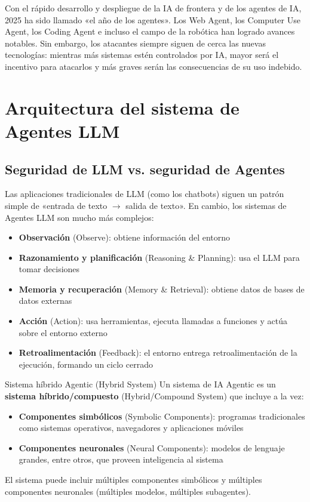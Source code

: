 \documentclass[a4paper]{article}
\begin{document}
Con el rápido desarrollo y despliegue de la IA de frontera y de los agentes de IA, 2025 ha sido llamado «el año de los agentes». Los Web Agent, los Computer Use Agent, los Coding Agent e incluso el campo de la robótica han logrado avances notables. Sin embargo, los atacantes siempre siguen de cerca las nuevas tecnologías: mientras más sistemas estén controlados por IA, mayor será el incentivo para atacarlos y más graves serán las consecuencias de su uso indebido.
\section{Arquitectura del sistema de Agentes LLM}

\subsection{Seguridad de LLM vs. seguridad de Agentes}

Las aplicaciones tradicionales de LLM (como los chatbots) siguen un patrón simple de «entrada de texto $\to$ salida de texto». En cambio, los sistemas de Agentes LLM son mucho más complejos:

\begin{itemize}
    \item \textbf{Observación} (Observe): obtiene información del entorno
    \item \textbf{Razonamiento y planificación} (Reasoning \& Planning): usa el LLM para tomar decisiones
    \item \textbf{Memoria y recuperación} (Memory \& Retrieval): obtiene datos de bases de datos externas
    \item \textbf{Acción} (Action): usa herramientas, ejecuta llamadas a funciones y actúa sobre el entorno externo
    \item \textbf{Retroalimentación} (Feedback): el entorno entrega retroalimentación de la ejecución, formando un ciclo cerrado
\end{itemize}

\begin{importantbox}{Sistema híbrido Agentic (Hybrid System)}
Un sistema de IA Agentic es un \textbf{sistema híbrido/compuesto} (Hybrid/Compound System) que incluye a la vez:
\begin{itemize}
    \item \textbf{Componentes simbólicos} (Symbolic Components): programas tradicionales como sistemas operativos, navegadores y aplicaciones móviles
    \item \textbf{Componentes neuronales} (Neural Components): modelos de lenguaje grandes, entre otros, que proveen inteligencia al sistema
\end{itemize}
El sistema puede incluir múltiples componentes simbólicos y múltiples componentes neuronales (múltiples modelos, múltiples subagentes).
\end{importantbox}
\end{document}
